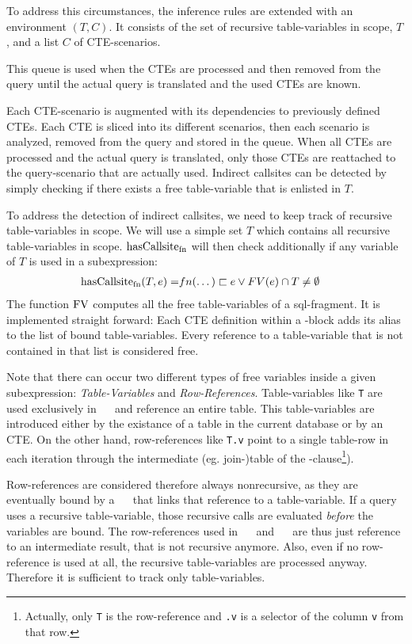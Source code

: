 To address this circumstances, the inference rules are extended with an environment $(T, C)$. It consists of the set of recursive table-variables in scope, $T$, and a list $C$ of CTE-scenarios. 

This queue is used when the CTEs are processed and then removed from the query until the actual query is translated and the used CTEs are known.

Each CTE-scenario is augmented with its dependencies to previously defined CTEs. Each CTE is sliced into its different scenarios, then each scenario is analyzed, removed from the query and stored in the queue. When all CTEs are processed and the actual query is translated, only those CTEs are reattached to the query-scenario that are actually used. Indirect callsites can be detected by simply checking if there exists a free table-variable that is enlisted in $T$.

To address the detection of indirect callsites, we need to keep track of recursive table-variables in scope. We will use a simple set $T$ which contains all recursive table-variables in scope. $\operatorname{\text{hasCallsite}_{fn}}$ will then check additionally if any variable of $T$ is used in a subexpression:
\begin{align*}
    \operatorname{\text{hasCallsite}_{fn}}(T, e) =& fn(\dots) \sqsubset e \lor FV(e) \cap T \neq \emptyset
\end{align*}
The function $\operatorname{\text{\rm FV}}$ computes all the free table-variables of a sql-fragment. It is implemented straight forward: Each CTE definition within a \WITH-block adds its alias to the list of bound table-variables. Every reference to a table-variable that is not contained in that list is considered free.

Note that there can occur two different types of free variables inside a given subexpression: \textit{Table-Variables} and \textit{Row-References}. Table-variables like \texttt{T} are used exclusively in ~\FROM~ and reference an entire table. This table-variables are introduced either by the existance of a table in the current database or by an CTE. On the other hand, row-references like \texttt{T.v} point to a single table-row in each iteration through the intermediate (eg. join-)table of the \FROM-clause\footnote{Actually, only \texttt{T} is the row-reference and \texttt{.v} is a selector of the column \texttt{v} from that row.}).

Row-references are considered therefore always nonrecursive, as they are eventually bound by a ~\FROM~ that links that reference to a table-variable. If a query uses a recursive table-variable, those recursive calls are evaluated \textit{before} the variables are bound. The row-references used in ~\SELECT~ and ~\WHERE~ are thus just reference to an intermediate result, that is not recursive anymore. Also, even if no row-reference is used at all, the recursive table-variables are processed anyway. Therefore it is sufficient to track only table-variables.
\\




